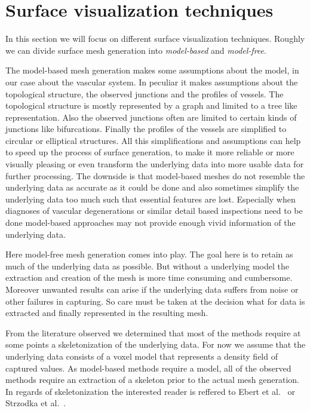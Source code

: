 

\section{Surface visualization techniques}

In this section we will focus on different surface visualization techniques. Roughly we can divide surface mesh generation into \emph{model-based} and \emph{model-free}.

The model-based mesh generation makes some assumptions about the model, in our case about the vascular system.
In peculiar it makes assumptions about the topological structure, the observed junctions and the profiles of vessels. The topological structure is mostly represented by a graph and limited to a tree like representation. Also the observed junctions often are limited to certain kinds of junctions like bifurcations. Finally the profiles of the vessels are simplified to circular or elliptical structures.
All this simplifications and assumptions can help to speed up the process of surface generation, to make it more reliable or more visually pleasing or even transform the underlying data into more usable data for further processing. The downside is that model-based meshes do not resemble the underlying data as accurate as it could be done and also sometimes simplify the underlying data too much such that essential features are lost.
Especially when diagnoses of vascular degenerations or similar detail based inspections need to be done model-based approaches may not provide enough vivid information of the underlying data.

Here model-free mesh generation comes into play. The goal here is to retain as much of the underlying data as possible. But without a underlying model the extraction and creation of the mesh is more time consuming and cumbersome. Moreover unwanted results can arise if the underlying data suffers from noise or other failures in capturing. So care must be taken at the decision what for data is extracted and finally represented in the resulting mesh.

From the literature observed we determined that most of the methods require at some points a skeletonization of the underlying data. For now we assume that the underlying data consists of a voxel model that represents a density field of captured values. As model-based methods require a model, all of the observed methods require an extraction of a skeleton prior to the actual mesh generation. In regards of skeletonization the interested reader is reffered to Ebert et al.~\cite{ebert2002augmented} or  Strzodka et al.~\cite{strzodka2004generalized}.

